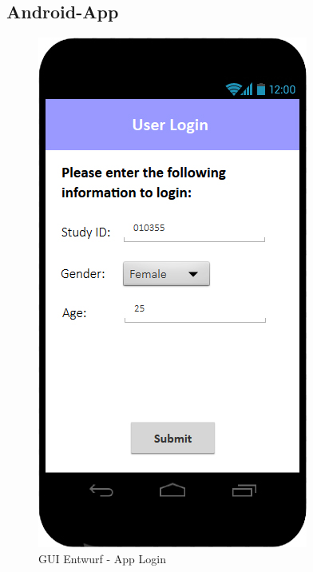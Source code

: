 \documentclass[a4paper]{scrreprt}
\begin{document}
        \newpage
        \subsection{Android-App}
	        \vspace*{2cm}
	        \begin{figure}[ht]
                \centering
                \includegraphics[scale = 0.3]{android_login.jpg}
                \caption{GUI Entwurf - App Login}
            \end{figure}
	
\end{document}
